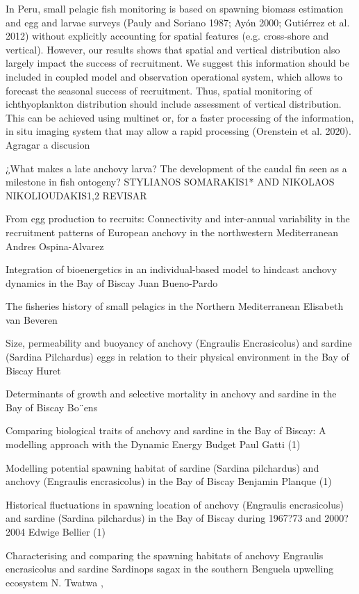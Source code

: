 In Peru, small pelagic fish monitoring is based on spawning biomass estimation and egg and larvae surveys (Pauly and Soriano 1987; Ayón 2000; Gutiérrez et al. 2012) without explicitly accounting for spatial features (e.g. cross-shore and vertical). However, our results shows that spatial and vertical distribution also largely impact the success of recruitment. We suggest this information should be included in coupled model and observation operational system, which allows to forecast the seasonal success of recruitment. Thus, spatial monitoring of ichthyoplankton distribution should include assessment of vertical distribution. This can be achieved using multinet or, for a faster processing of the information, in situ imaging system that may allow a rapid processing (Orenstein et al. 2020).\\

Agragar a discusion

¿What makes a late anchovy larva? The
development of the caudal fin seen as a
milestone in fish ontogeny?
STYLIANOS SOMARAKIS1* AND NIKOLAOS NIKOLIOUDAKIS1,2 REVISAR

From egg production to recruits: Connectivity and inter-annual
variability in the recruitment patterns of European anchovy
in the northwestern Mediterranean
Andres Ospina-Alvarez

Integration of bioenergetics in an individual-based model
to hindcast anchovy dynamics in the Bay of Biscay
Juan Bueno-Pardo

The fisheries history of small pelagics in the Northern Mediterranean
Elisabeth van Beveren

Size, permeability and buoyancy of anchovy (Engraulis
Encrasicolus) and sardine (Sardina Pilchardus) eggs in
relation to their physical environment in the Bay of Biscay
Huret

Determinants of growth and selective mortality in anchovy and sardine in
the Bay of Biscay
Bo¨ens

Comparing biological traits of anchovy and sardine in the Bay of Biscay: A modelling approach with the Dynamic Energy Budget
Paul Gatti (1) 

Modelling potential spawning habitat of sardine (Sardina pilchardus) and anchovy (Engraulis encrasicolus) in the Bay of Biscay
Benjamin Planque (1) 

Historical fluctuations in spawning location of anchovy (Engraulis encrasicolus) and sardine (Sardina pilchardus) in the Bay of Biscay during 1967?73 and 2000?2004
Edwige Bellier (1)

Characterising and comparing the spawning habitats of anchovy Engraulis encrasicolus and sardine Sardinops sagax in the southern Benguela upwelling ecosystem
N. Twatwa ,